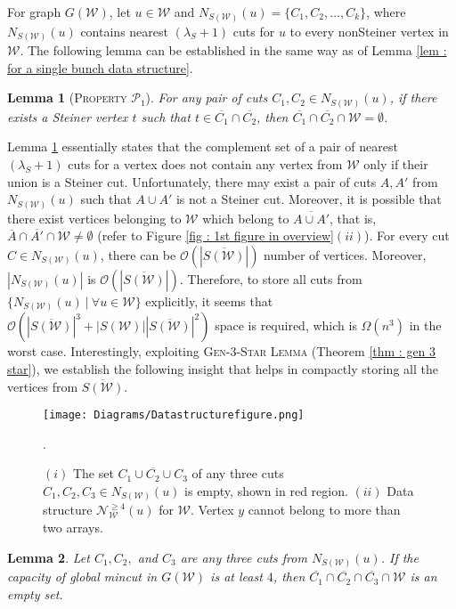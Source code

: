 \documentclass[letterpaper,11pt]{article}
\newtheorem{lemma}{Lemma}[]
\begin{document}
For graph $G({\mathcal W})$, let $u\in {\mathcal W}$ and $N_{S({\mathcal W})}(u)=\{C_1,C_2,\ldots,C_k\}$, where $N_{S({\mathcal W})}(u)$ contains nearest $(\lambda_S+1)$ cuts for $u$ to every nonSteiner vertex in ${\mathcal W}$. 
The following lemma can be established in the same way as of Lemma \ref{lem : for a single bunch data structure}. \begin{lemma} [\textsc{Property ${\mathcal P}_1$}] \label{lem : pair of bunches}
   For any pair of cuts $C_1,C_2\in N_{S({\mathcal W})}(u)$, if there exists a Steiner vertex $t$ such that $t\in \overline{C_1}\cap \overline{C_2}$, then $\overline{C_1}\cap \overline{C_2}\cap {\mathcal W}=\emptyset$.  
\end{lemma}
Lemma \ref{lem : pair of bunches} essentially states that the complement set of a pair of nearest $(\lambda_S+1)$ cuts for a vertex does not contain any vertex from ${\mathcal W}$ only if their union is a Steiner cut. Unfortunately, there may exist a pair of cuts $A,A'$ from $N_{S({\mathcal W})}(u)$ such that $A\cup A'$ is not a Steiner cut. Moreover, it is possible that there exist vertices belonging to ${\mathcal W}$ which belong to $\overline{A\cup A'}$, that is, $\overline{A}\cap \overline{A'}\cap {\mathcal W}\ne \emptyset$ (refer to Figure \ref{fig : 1st figure in overview}$(ii)$). 
For every cut $C\in N_{S({\mathcal W})}(u)$, there can be ${\mathcal O}(|\overline{S({\mathcal W})}|)$ number of vertices. Moreover, $|N_{S({\mathcal W})}(u)|$ is ${\mathcal O}(|\overline{S({\mathcal W})}|)$. Therefore, to store all cuts from $\{N_{S({\mathcal W})}(u)~|~\forall u\in {\mathcal W}\}$ explicitly, it seems that ${\mathcal O}(|\overline{S({\mathcal W})}|^3+|S({\mathcal W})||\overline{S({\mathcal W})}|^2)$ space is required, which is $\Omega(n^3)$ in the worst case. Interestingly, exploiting \textsc{Gen-3-Star Lemma} (Theorem \ref{thm : gen 3 star}), we establish the following insight that helps in compactly storing all the vertices from $\overline{S({\mathcal W})}$. \begin{figure}
 \centering
    \texttt{[image: Diagrams/Datastructurefigure.png]} 
   \caption{$(i)$ The set $\overline{C_1\cup C_2\cup C_3}$
   of any three cuts $C_1,C_2,C_3\in N_{S({\mathcal W})}(u)$ is empty, shown in red region. $(ii)$ Data structure ${\mathcal N}_{{\mathcal W}}^{\ge 4}(u)$ for ${\mathcal W}$. Vertex $y$ cannot belong to more than two arrays.}
  \label{fig : data structure}. 
\end{figure}
\begin{lemma} \label{lem : three sets are nonempty}
    Let $C_1,C_2,$ and $C_3$ are any three cuts from $N_{S({\mathcal W})}(u)$. If the capacity of global mincut in $G({\mathcal W})$ is at least $4$, then $\overline{C_1}\cap \overline{C_2} \cap \overline{C_3}\cap {\mathcal W}$ is an empty set. 
\end{lemma}
\end{document}
